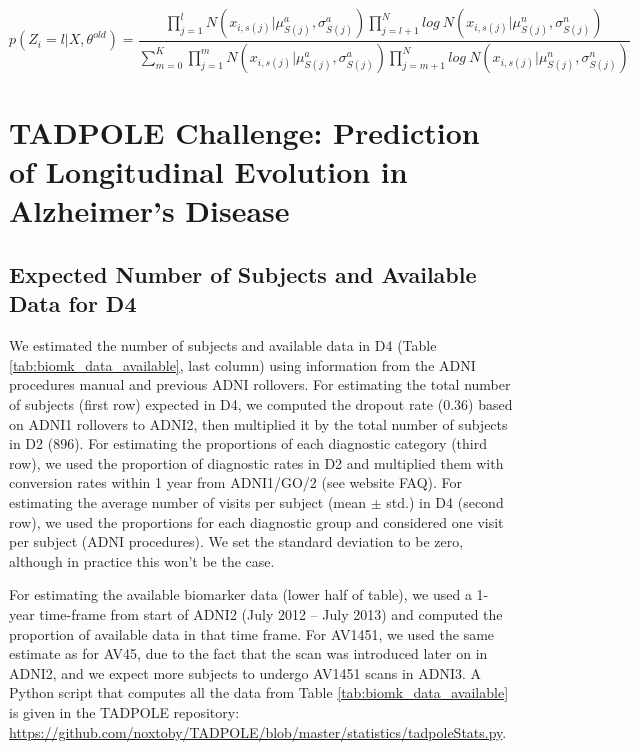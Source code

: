 \begin{equation}
p(Z_i = l|X, \theta^{old}) = \frac{\prod_{j=1}^{l} N(x_{i,s(j)}|\mu_{S(j)}^a, \sigma_{S(j)}^a)\prod_{j=l + 1}^N log\ N(x_{i,s(j)}|\mu_{S(j)}^n, \sigma_{S(j)}^n)}{\sum_{m=0}^K \prod_{j=1}^{m} N(x_{i,s(j)}|\mu_{S(j)}^a, \sigma_{S(j)}^a)\prod_{j=m + 1}^N log\ N(x_{i,s(j)}|\mu_{S(j)}^n, \sigma_{S(j)}^n) }
\end{equation}

\chapter[TADPOLE Challenge: Prediction of Longitudinal Evolution in AD]{TADPOLE Challenge: Prediction of Longitudinal Evolution in Alzheimer's Disease}

\section{Expected Number of Subjects and Available Data for D4}
\label{app:expectedD4}

We estimated the number of subjects and available data in D4 (Table \ref{tab:biomk_data_available}, last column) using information from the ADNI procedures manual and previous ADNI rollovers. For estimating the total number of subjects (first row) expected in D4, we computed the dropout rate (0.36) based on ADNI1 rollovers to ADNI2, then multiplied it by the total number of subjects in D2 (896). For estimating the proportions of each diagnostic category (third row), we used the proportion of diagnostic rates in D2 and multiplied them with conversion rates within 1 year from ADNI1/GO/2 (see website FAQ). For estimating the average number of visits per subject (mean $\pm$ std.) in D4 (second row), we used the proportions for each diagnostic group and considered one visit per subject (ADNI procedures). We set the standard deviation to be zero, although in practice this won't be the case. 

For estimating the available biomarker data (lower half of table), we used a 1-year time-frame from start of ADNI2 (July 2012 -- July 2013) and computed the proportion of available data in that time frame. For AV1451, we used the same estimate as for AV45, due to the fact that the scan was introduced later on in ADNI2, and we expect more subjects to undergo AV1451 scans in ADNI3. A Python script that computes all the data from Table \ref{tab:biomk_data_available} is given in the TADPOLE repository: \url{https://github.com/noxtoby/TADPOLE/blob/master/statistics/tadpoleStats.py}.
